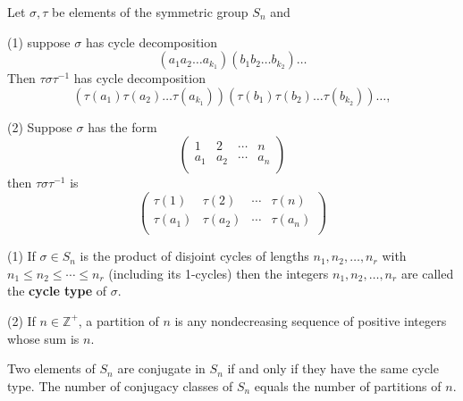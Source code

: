 \begin{proposition}
    Let $\sigma, \tau$ be elements of the symmetric group $S_n$ and

    (1) suppose $\sigma$ has cycle decomposition
    \[
        \left(a_1 a_2 \ldots a_{k_1}\right)\left(b_1 b_2 \ldots b_{k_2}\right) \ldots
    \]
    Then $\tau \sigma \tau^{-1}$ has cycle decomposition
    \[
        \left(\tau\left(a_1\right) \tau\left(a_2\right) \ldots \tau\left(a_{k_1}\right)\right)\left(\tau\left(b_1\right) \tau\left(b_2\right) \ldots \tau\left(b_{k_2}\right)\right) \ldots,
    \]

    (2) Suppose $\sigma$ has the form
    \[
        \left(\begin{matrix}
                1   & 2   & \cdots & n   \\
                a_1 & a_2 & \cdots & a_n \\
            \end{matrix}\right)
    \]
    then $\tau \sigma \tau^{-1}$ is
    \[
        \left(\begin{matrix}
                \tau(1)   & \tau(2)   & \cdots & \tau(n)   \\
                \tau(a_1) & \tau(a_2) & \cdots & \tau(a_n) \\
            \end{matrix}\right)
    \]
\end{proposition}
\begin{definition}
    (1) If $\sigma \in S_n$ is the product of disjoint cycles of lengths $n_1, n_2, \ldots, n_r$ with $n_1 \leq n_2 \leq \cdots \leq n_r$ (including its 1-cycles) then the integers $n_1, n_2, \ldots, n_r$ are called the \textbf{cycle type} of $\sigma$.

    (2) If $n \in \mathbb{Z}^{+}$, a partition of $n$ is any nondecreasing sequence of positive integers whose sum is $n$.
\end{definition}
\begin{proposition}
    Two elements of $S_n$ are conjugate in $S_n$ if and only if they have the same cycle type. The number of conjugacy classes of $S_n$ equals the number of partitions of $n$.
\end{proposition}


